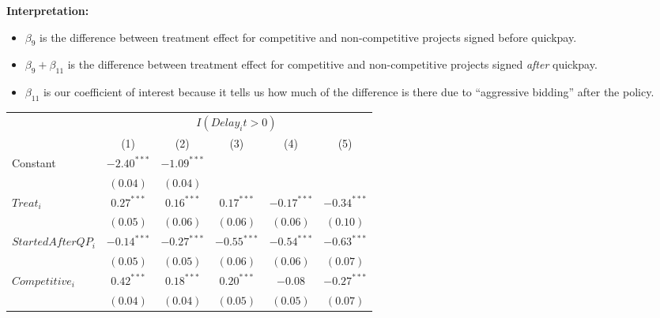 \documentclass[
]{article}
\providecommand{\tightlist}{%
  \setlength{\itemsep}{0pt}\setlength{\parskip}{0pt}}
\begin{document}
\textbf{Interpretation:}

\begin{itemize}
\tightlist
\item
  \(\beta_9\) is the difference between treatment effect for competitive
  and non-competitive projects signed before quickpay.
\item
  \(\beta_9 + \beta_{11}\) is the difference between treatment effect
  for competitive and non-competitive projects signed \emph{after}
  quickpay.
\item
  \(\beta_{11}\) is our coefficient of interest because it tells us how
  much of the difference is there due to ``aggressive bidding'' after
  the policy.
\end{itemize}

\begin{table}
\begin{center}
\begin{tabular}{l c c c c c}
\hline
 & \multicolumn{5}{c}{$I(Delay_it>0)$} \\
\cline{2-6}
 & (1) & (2) & (3) & (4) & (5) \\
\hline
Constant                                                             & $-2.40^{***}$ & $-1.09^{***}$ &               &               &               \\
                                                                     & $(0.04)$      & $(0.04)$      &               &               &               \\
$Treat_i$                                                            & $0.27^{***}$  & $0.16^{***}$  & $0.17^{***}$  & $-0.17^{***}$ & $-0.34^{***}$ \\
                                                                     & $(0.05)$      & $(0.06)$      & $(0.06)$      & $(0.06)$      & $(0.10)$      \\
$StartedAfterQP_i$                                                   & $-0.14^{***}$ & $-0.27^{***}$ & $-0.55^{***}$ & $-0.54^{***}$ & $-0.63^{***}$ \\
                                                                     & $(0.05)$      & $(0.05)$      & $(0.06)$      & $(0.06)$      & $(0.07)$      \\
$Competitive_i$                                                      & $0.42^{***}$  & $0.18^{***}$  & $0.20^{***}$  & $-0.08$       & $-0.27^{***}$ \\
                                                                     & $(0.04)$      & $(0.04)$      & $(0.05)$      & $(0.05)$      & $(0.07)$      \\

\end{tabular}
\end{center}
\end{table}
\end{document}

